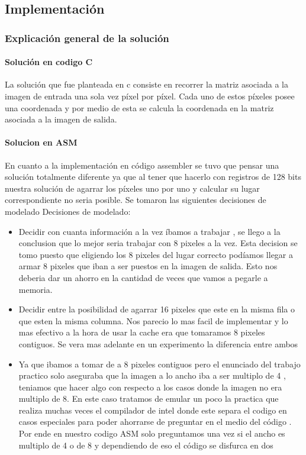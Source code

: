 \subsection{Implementación}
\subsubsection*{Explicación general de la solución}
\paragraph{Solución en codigo C}
La solución que fue planteada en c consiste en recorrer la matriz asociada a la imagen de entrada una sola vez píxel por píxel. Cada uno de estos píxeles posee una coordenada y por medio de esta se calcula la coordenada en la matriz asociada a la imagen de salida. 



\paragraph{Solucion en ASM}
En cuanto a la implementación en código assembler se tuvo que pensar una solución totalmente diferente ya que al tener que hacerlo con registros de 128 bits nuestra solución de agarrar los píxeles uno por uno y calcular su lugar correspondiente no seria posible. Se tomaron las siguientes decisiones de modelado Decisiones de modelado:
\begin{itemize}
\item Decidir con cuanta información a la vez íbamos a trabajar , se llego a la conclusion que lo mejor seria trabajar con 8 pixeles a la vez. Esta decision se tomo puesto que eligiendo los 8 pixeles del lugar correcto podíamos llegar a armar 8 pixeles que iban a ser puestos en la imagen de salida. Esto nos deberia dar un ahorro en la cantidad de veces que vamos a pegarle a memoria.
\item Decidir entre la posibilidad de agarrar 16 pixeles que este en la misma fila o que esten la misma columna. Nos parecio lo mas facil de implementar y lo mas efectivo a la hora de usar la cache era que tomaramos 8 pixeles contiguos. Se vera mas adelante en un experimento la diferencia entre ambos
\item Ya que ibamos a tomar de a 8 pixeles contiguos pero el enunciado del trabajo practico solo aseguraba que la imagen a lo ancho iba a ser multiplo de 4 , teniamos que hacer algo con respecto a los casos donde la imagen no era multiplo de 8. En este caso tratamos de emular un poco la practica que realiza muchas veces el compilador de intel donde este separa el codigo en casos especiales para poder ahorrarse de preguntar en el medio del código . Por ende en nuestro codigo ASM solo preguntamos una vez si el ancho es multiplo de 4 o de 8 y dependiendo de eso el código se disfurca en dos
\end{itemize}

